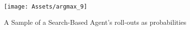 \begin{figure}
	\centering
	\texttt{[image: Assets/argmax\_9]}
	\caption{A Sample of a Search-Based Agent's roll-outs as probabilities }
	\label{fig:argmax_1}
\end{figure}